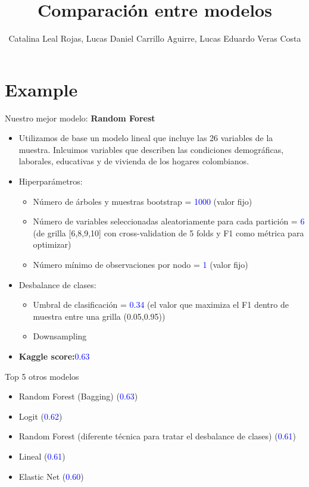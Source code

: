 \documentclass[11pt]{beamer}
\author[Grupo 3]{Catalina Leal Rojas, Lucas Daniel Carrillo Aguirre, Lucas Eduardo Veras Costa}
\title[Sección 2]{Comparación entre modelos}
\begin{document}
\begin{frame}
\titlepage
\end{frame}

\section{Example}

\begin{frame}{Nuestro mejor modelo: \textbf{Random Forest}}
\begin{itemize}
\item Utilizamos de base un modelo lineal que incluye las 26 variables de la muestra. Inlcuimos variables que describen las condiciones demográficas, laborales, educativas y de vivienda de los hogares colombianos.
\item Hiperparámetros:
\begin{itemize}
    \item Número de árboles y muestras bootstrap = \textcolor{blue}{1000} (valor fijo)
    \item Número de variables seleccionadas aleatoriamente para cada partición = \textcolor{blue}{6} (de grilla [6,8,9,10] con cross-validation de 5 folds y F1 como métrica para optimizar)
    \item Número mínimo de observaciones por nodo = \textcolor{blue}{1} (valor fijo)
\end{itemize}
\item Desbalance de clases: 
\begin{itemize}
    \item Umbral de clasificación = \textcolor{blue}{0.34} (el valor que maximiza el F1 dentro de muestra entre una grilla (0.05,0.95))
    \item Downsampling
\end{itemize}
\item \textbf{Kaggle score:}\textcolor{blue}{0.63}
\end{itemize}


\end{frame}

\begin{frame}{Top 5 otros modelos}
    \begin{itemize}
        \item Random Forest (Bagging) (\textcolor{blue}{0.63})
        \item Logit (\textcolor{blue}{0.62})
        \item Random Forest (diferente técnica para tratar el desbalance de clases) (\textcolor{blue}{0.61})
        \item Lineal (\textcolor{blue}{0.61})
    \item Elastic Net (\textcolor{blue}{0.60})
    \end{itemize}
\end{frame}
\end{document}
